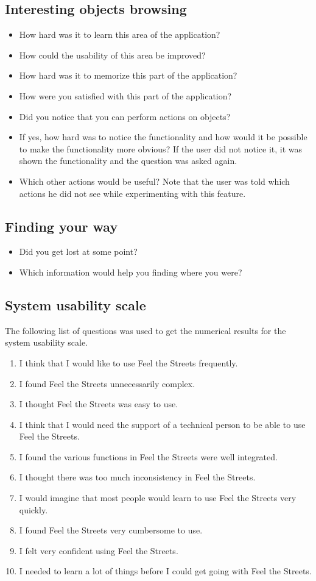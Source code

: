 \documentclass[nolof,digital]{fithesis3}
\begin{document}
\subsection{Interesting objects browsing}
\begin{itemize}
\item How hard was it to learn this area of the application?
\item How could the usability of this area be improved?
\item How hard was it to memorize this part of the application?
\item How were you satisfied with this part of the application?
\item Did you notice that you can perform actions on objects?
\item If yes, how hard was to notice the functionality and how would it be possible to make the functionality more obvious? If the user did not notice it, it was shown the functionality and the question was asked again.
\item Which other actions would be useful? Note that the user was told which actions he did not see while experimenting with this feature.
\end{itemize}
\subsection{Finding your way}
\begin{itemize}
\item Did you get lost at some point?
\item Which information would help you finding where you were?
\end{itemize}
\subsection{System usability scale}
The following list of questions was used to get the numerical results for the system usability scale.
\begin{enumerate}
\item I think that I would like to use Feel the Streets frequently.
\item I found Feel the Streets unnecessarily complex.
\item I thought Feel the Streets was easy to use.
\item I think that I would need the support of a technical person to be able to use Feel the Streets.
\item I found the various functions in Feel the Streets were well integrated.
\item I thought there was too much inconsistency in Feel the Streets.
\item I would imagine that most people would learn to use Feel the Streets very quickly.
\item I found Feel the Streets very cumbersome to use.
\item I felt very confident using Feel the Streets.
\item I needed to learn a lot of things before I could get going with Feel the Streets.
\end{enumerate}
\end{document}
